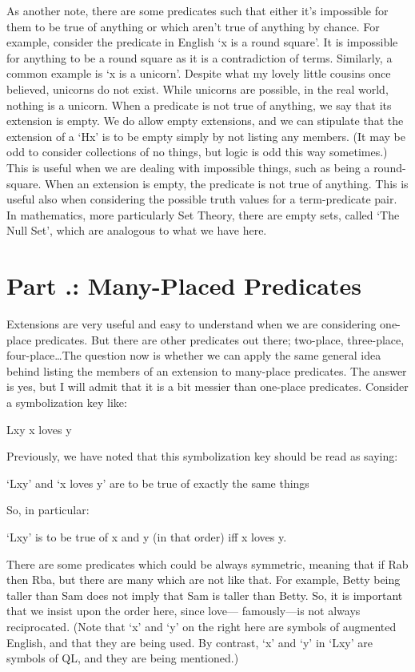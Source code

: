 As another note, there are some predicates such that either it's impossible for them to be true of anything or which aren't true of anything by chance. For example, consider the predicate in English ‘x is a round square’. It is impossible for anything to be a round square as it is a contradiction of terms. Similarly, a common example is ‘x is a unicorn'. Despite what my lovely little cousins once believed, unicorns do not exist. While unicorns are possible, in the real world, nothing is a unicorn. When a predicate is not true of anything, we say that its extension is empty. We do allow empty extensions, and we can stipulate that the extension of a ‘Hx’ is to be empty simply by not listing any members. (It may be odd to consider collections of no things, but logic is odd this way sometimes.) This is useful when we are dealing with impossible things, such as being a round-square. When an extension is empty, the predicate is not true of anything. This is useful also when considering the possible truth values for a term-predicate pair. In mathematics, more particularly Set Theory, there are empty sets, called ‘The Null Set', which are analogous to what we have here.
\section{Part \thechapcount.\theseccount: Many-Placed Predicates}\label{s.manyplaced}
Extensions are very useful and easy to understand when we are considering one-place predicates. But there are other predicates out there; two-place, three-place, four-place\ldots  The question now is whether we can apply the same general idea behind listing the members of an extension to many-place predicates. The answer is yes, but I will admit that it is a bit messier than one-place predicates. Consider a symbolization key like:
\begin{ekey}
\item[Lxy] x loves y
\end{ekey}
Previously, we have noted that this symbolization key should be read as saying:
\begin{center}
‘Lxy’ and ‘x loves y’ are to be true of exactly the same things
\end{center}
So, in particular:
\begin{center}
‘Lxy’ is to be true of x and y (in that order) iff x loves y.
\end{center}
There are some predicates which could be always symmetric, meaning that if Rab then Rba, but there are many which are not like that. For example, Betty being taller than Sam does not imply that Sam is taller than Betty. So, it is important that we insist upon the order here, since love— famously—is not always reciprocated. (Note that ‘x’ and ‘y’ on the right here are symbols of augmented English, and that they are being used. By contrast, ‘x’ and ‘y’ in ‘Lxy’ are symbols of QL, and they are being mentioned.)

